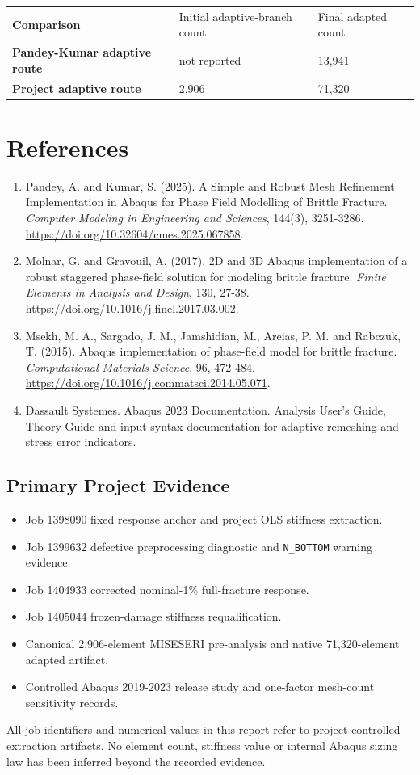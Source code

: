 \documentclass[10pt,a4paper]{article}
\newcommand{\rowcolor}[1]{}
\newcommand{\headrow}{\color{navy}\bfseries}
\begin{document}
\small
\par\smallskip\noindent
\begin{tabularx}{\textwidth}{>{\bfseries}Yp{50mm}p{42mm}}
\headrow Comparison & Initial adaptive-branch count & Final adapted count\\
Pandey-Kumar adaptive route & not reported & 13,941\\
\rowcolor{paleblue}Project adaptive route & 2,906 & 71,320\\
\end{tabularx}\par\smallskip
\normalsize

\newpage
\section{References}
\begin{enumerate}[leftmargin=7mm,itemsep=6pt]
\item Pandey, A. and Kumar, S. (2025). A Simple and Robust Mesh Refinement Implementation in Abaqus for Phase Field Modelling of Brittle Fracture. \textit{Computer Modeling in Engineering and Sciences}, 144(3), 3251-3286. \url{https://doi.org/10.32604/cmes.2025.067858}.
\item Molnar, G. and Gravouil, A. (2017). 2D and 3D Abaqus implementation of a robust staggered phase-field solution for modeling brittle fracture. \textit{Finite Elements in Analysis and Design}, 130, 27-38. \url{https://doi.org/10.1016/j.finel.2017.03.002}.
\item Msekh, M. A., Sargado, J. M., Jamshidian, M., Areias, P. M. and Rabczuk, T. (2015). Abaqus implementation of phase-field model for brittle fracture. \textit{Computational Materials Science}, 96, 472-484. \url{https://doi.org/10.1016/j.commatsci.2014.05.071}.
\item Dassault Systemes. Abaqus 2023 Documentation. Analysis User's Guide, Theory Guide and input syntax documentation for adaptive remeshing and stress error indicators.
\end{enumerate}

\subsection{Primary Project Evidence}
\begin{itemize}
\item Job 1398090 fixed response anchor and project OLS stiffness extraction.
\item Job 1399632 defective preprocessing diagnostic and \texttt{N\_BOTTOM} warning evidence.
\item Job 1404933 corrected nominal-1\% full-fracture response.
\item Job 1405044 frozen-damage stiffness requalification.
\item Canonical 2,906-element MISESERI pre-analysis and native 71,320-element adapted artifact.
\item Controlled Abaqus 2019-2023 release study and one-factor mesh-count sensitivity records.
\end{itemize}

{\small All job identifiers and numerical values in this report refer to project-controlled extraction artifacts. No element count, stiffness value or internal Abaqus sizing law has been inferred beyond the recorded evidence.}
\end{document}
